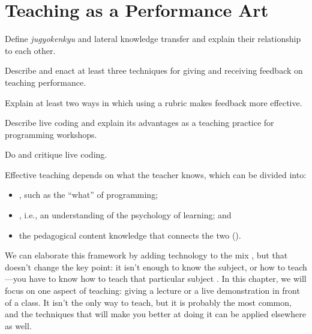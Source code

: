 \chapter{Teaching as a Performance Art}\label{s:performance}

\begin{objectives}

\item
  Define \emph{jugyokenkyu} and lateral knowledge transfer and explain
  their relationship to each other.

\item
  Describe and enact at least three techniques for giving and
  receiving feedback on teaching performance.

\item
  Explain at least two ways in which using a rubric makes feedback
  more effective.

\item
  Describe live coding and explain its advantages as a teaching
  practice for programming workshops.

\item
  Do and critique live coding.

\end{objectives}

Effective teaching depends on what the teacher knows, which can be
divided into:

\begin{itemize}

\item
  , such as the
  ``what'' of programming;

\item
  , i.e., an understanding of the psychology of learning;
  and

\item
  the pedagogical content knowledge that connects the two
  ().

\end{itemize}

We can elaborate this framework by adding technology to the mix
\cite{Koeh2013}, but that doesn't change the key point: it isn't
enough to know the subject, or how to teach---you have to know how to
teach that particular subject \cite{Maye2004}.  In this chapter, we
will focus on one aspect of teaching: giving a lecture or a live
demonstration in front of a class.  It isn't the only way to teach,
but it is probably the most common, and the techniques that will make
you better at doing it can be applied elsewhere as well.

